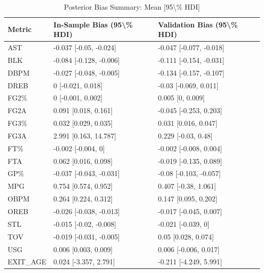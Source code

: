 \begin{table}[t]
\caption*{
{\fontsize{20}{25}\selectfont  Posterior Bias Summary: Mean [95\textbackslash{}\% HDI]\fontsize{12}{15}\selectfont }
} 
\fontsize{12.0pt}{14.0pt}\selectfont
\begin{tabular*}{\linewidth}{@{\extracolsep{\fill}}lll}
\toprule
Metric & In-Sample Bias (95\textbackslash{}\% HDI) & Validation Bias (95\textbackslash{}\% HDI) \\ 
\midrule\addlinespace[2.5pt]
AST & -0.037 [-0.05, -0.024] & -0.047 [-0.077, -0.018] \\ 
BLK & -0.084 [-0.128, -0.006] & -0.111 [-0.154, -0.031] \\ 
DBPM & -0.027 [-0.048, -0.005] & -0.134 [-0.157, -0.107] \\ 
DREB & 0 [-0.021, 0.018] & -0.03 [-0.069, 0.011] \\ 
FG2\% & 0 [-0.001, 0.002] & 0.005 [0, 0.009] \\ 
FG2A & 0.091 [0.018, 0.161] & -0.045 [-0.253, 0.203] \\ 
FG3\% & 0.032 [0.029, 0.035] & 0.031 [0.016, 0.047] \\ 
FG3A & 2.991 [0.163, 14.787] & 0.229 [-0.03, 0.48] \\ 
FT\% & -0.002 [-0.004, 0] & -0.002 [-0.008, 0.004] \\ 
FTA & 0.062 [0.016, 0.098] & -0.019 [-0.135, 0.089] \\ 
GP\% & -0.037 [-0.043, -0.031] & -0.08 [-0.103, -0.057] \\ 
MPG & 0.754 [0.574, 0.952] & 0.407 [-0.38, 1.061] \\ 
OBPM & 0.264 [0.224, 0.312] & 0.147 [0.095, 0.202] \\ 
OREB & -0.026 [-0.038, -0.013] & -0.017 [-0.045, 0.007] \\ 
STL & -0.015 [-0.02, -0.008] & -0.021 [-0.039, 0] \\ 
TOV & -0.019 [-0.031, -0.005] & 0.05 [0.028, 0.074] \\ 
USG & 0.006 [0.003, 0.009] & 0.006 [-0.006, 0.017] \\ 
EXIT\_AGE & 0.024 [-3.357, 2.791] & -0.211 [-4.249, 5.991] \\ 
\bottomrule
\end{tabular*}
\end{table}


